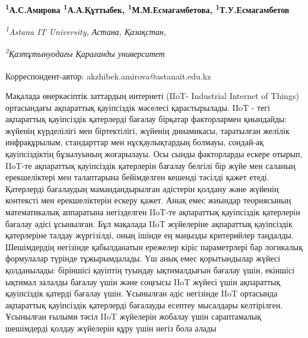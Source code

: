 
\begin{articleheader}

{\bfseries
\textsuperscript{1}А.С.Амирова\textsuperscript{\envelope } \authorid
\textsuperscript{1}А.А.Құттыбек\authorid,
\textsuperscript{1}М.М.Есмагамбетова\authorid,
\textsuperscript{1}Т.У.Есмагамбетов\authorid}
\end{articleheader}

\begin{affiliation}
\emph{\textsuperscript{1}Astana IT University, Астана, Қазақстан,}

\emph{\textsuperscript{2}Қазтұтынуодағы Қарағанды университет}

\raggedright \textsuperscript{\envelope }Корреспондент-автор: akzhibek.amirova@astanait.edu.kz
\end{affiliation}

Мақалада өнеркәсіптік заттардың интернеті (IIoT- Industrial Internet of
Things) ортасындағы ақпараттық қауіпсіздік мәселесі қарастырылады. IIoT
- тегі ақпараттық қауіпсіздік қатерлерді бағалау бірқатар факторлармен
қиындайды: жүйенің күрделілігі мен біртектілігі, жүйенің динамикасы,
таратылған желілік инфрақұрылым, стандарттар мен нұсқаулықтардың
болмауы, сондай-ақ қауіпсіздіктің бұзылуының жоғарылауы. Осы сынды
факторларды ескере отырып, IIoT-те ақпараттық қауіпсіздік қатерлерін
бағалау белгілі бір жүйе мен саланың ерекшеліктері мен талаптарына
бейімделген кешенді тәсілді қажет етеді. Қатерлерді бағалаудың
мамандандырылған әдістерін қолдану және жүйенің контексті мен
ерекшеліктерін ескеру қажет. Анық емес жиындар теориясының математикалық
аппаратына негізделген IIoT-те ақпараттық қауіпсіздік қатерлерін бағалау
әдісі ұсынылған. Бұл мақалада IIoT жүйелеріне ақпараттық қауіпсіздік
қатерлеріне талдау жүргізілді, оның ішінде ең маңызды критерийлер
таңдалды. Шешімдердің негізінде қабылданатын ережелер кіріс параметрлері
бар логикалық формулалар түрінде тұжырымдалады. Үш анық емес
қорытындылар жүйесі қолданылады: біріншісі қауіптің туындау ықтималдығын
бағалау үшін, екіншісі ықтимал залалды бағалау үшін және соңғысы IIoT
жүйесі үшін ақпараттық қауіпсіздік қатерді бағалау үшін. Ұсынылған әдіс
негізінде IIoT ортасында ақпараттық қауіпсіздік қатерлерді бағалауды
есептеу мысалдары келтірілген. Ұсынылған ғылыми тәсіл IIoT жүйелерін
жобалау үшін сараптамалық шешімдерді қолдау жүйелерін құру үшін негіз
бола алады

